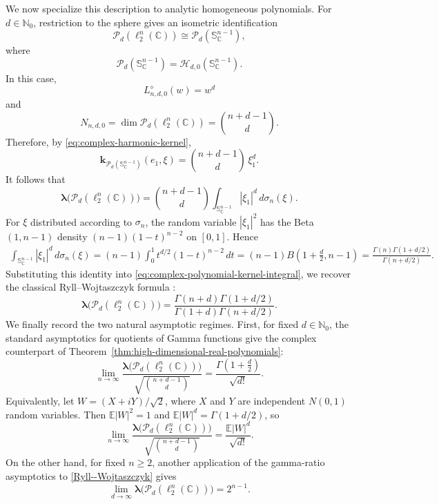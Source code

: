 \documentclass[11pt,showkeys]{amsart}
\begin{document}
We now specialize this description to analytic homogeneous
polynomials. For \(d\in\mathbb N_0\), restriction to the sphere gives
an isometric identification
\[
    \mathcal P_d(\ell_2^n(\mathbb C))
    \cong
    \mathcal P_d(\mathbb S_{\mathbb C}^{n-1}),
\]
where
\[
    \mathcal P_d(\mathbb S_{\mathbb C}^{n-1})
    =
    \mathcal H_{d,0}(\mathbb S_{\mathbb C}^{n-1}).
\]
In this case,
\[
    L^\diamond_{n,d,0}(w)=w^d
\]
and
\[
    N_{n,d,0}
    =
    \dim\mathcal P_d(\ell_2^n(\mathbb C))
    =
    \binom{n+d-1}{d}.
\]
Therefore, by \eqref{eq:complex-harmonic-kernel},
\[
    \mathbf k_{\mathcal P_d
        (\mathbb S_{\mathbb C}^{n-1})}(e_1,\xi)
    =
    \binom{n+d-1}{d}\,\xi_1^d.
\]
It follows that
\begin{equation}
\label{eq:complex-polynomial-kernel-integral}
    \boldsymbol\lambda
        \bigl(\mathcal P_d(\ell_2^n(\mathbb C))\bigr)
    =
    \binom{n+d-1}{d}
    \int_{\mathbb S_{\mathbb C}^{n-1}}
    |\xi_1|^d\,d\sigma_n(\xi).
\end{equation}
For \(\xi\) distributed according to \(\sigma_n\), the random variable
\(|\xi_1|^2\) has the Beta\((1,n-1)\) density
\((n-1)(1-t)^{n-2}\) on \([0,1]\). Hence
\begin{align*}
    \int_{\mathbb S_{\mathbb C}^{n-1}}
    |\xi_1|^d\,d\sigma_n(\xi)
    =
    (n-1)\int_0^1
    t^{d/2}(1-t)^{n-2}\,dt   =
    (n-1)
    B\left(1+\frac d2,n-1\right) =
    \frac{\Gamma(n)\Gamma(1+d/2)}
         {\Gamma(n+d/2)}.
\end{align*}
Substituting this identity into
\eqref{eq:complex-polynomial-kernel-integral}, we recover the classical
Ryll--Wojtaszczyk formula
\cite{ryll1983homogeneous}:
\begin{equation}
\label{Ryll--Wojtaszczyk}
    \boldsymbol\lambda
        \bigl(\mathcal P_d(\ell_2^n(\mathbb C))\bigr)
    =
    \frac{\Gamma(n+d)\Gamma(1+d/2)}
         {\Gamma(1+d)\Gamma(n+d/2)}.
\end{equation}
We finally record the two natural asymptotic regimes. First, for fixed
\(d\in\mathbb N_0\), the standard asymptotics for quotients of Gamma
functions give the complex counterpart of
Theorem~\ref{thm:high-dimensional-real-polynomials}:
\[
    \lim_{n\to\infty}
    \frac{
        \boldsymbol\lambda
        \bigl(\mathcal P_d(\ell_2^n(\mathbb C))\bigr)
    }{
        \sqrt{\binom{n+d-1}{d}}
    }
    =
    \frac{\Gamma\left(1+\frac d2\right)}{\sqrt{d!}}.
\]
Equivalently, let \(W=(X+iY)/\sqrt2\), where \(X\) and \(Y\) are
independent \(N(0,1)\) random variables. Then
\(\mathbb E|W|^2=1\) and
\(\mathbb E|W|^d=\Gamma(1+d/2)\), so
\[
    \lim_{n\to\infty}
    \frac{
        \boldsymbol\lambda
        \bigl(\mathcal P_d(\ell_2^n(\mathbb C))\bigr)
    }{
        \sqrt{\binom{n+d-1}{d}}
    }
    =
    \frac{\mathbb E|W|^d}{\sqrt{d!}}.
\]
On the other hand, for fixed \(n\geq2\), another application of the
gamma-ratio asymptotics to \eqref{Ryll--Wojtaszczyk} gives
\[
    \lim_{d\to\infty}
    \boldsymbol\lambda
        \bigl(\mathcal P_d(\ell_2^n(\mathbb C))\bigr)
    =
    2^{n-1}.
\]
\end{document}

